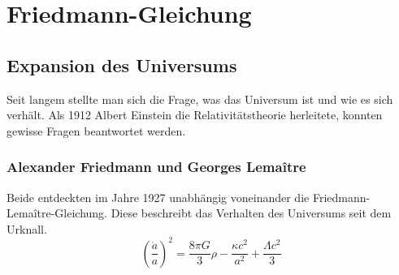 \chapter{Friedmann-Gleichung\label{chapter:thema}}
\begin{refsection}
\printbibliography[heading=subbibliography]
\section{Expansion des Universums}
Seit langem stellte man sich die Frage, was das Universum ist und wie es sich verhält. Als 1912 Albert Einstein die Relativitätstheorie herleitete, konnten gewisse Fragen beantwortet werden.
\subsection{Alexander Friedmann und Georges Lema\^{i}tre}
Beide entdeckten im Jahre 1927 unabhängig voneinander die Friedmann-Lema\^{i}tre-Gleichung. Diese beschreibt das Verhalten des Universums seit dem Urknall. 
\begin{equation}
\left(\frac{\dot{a}}{a}\right) ^2 = \frac{8 \pi G}{3} \rho - \frac{\kappa c^2}{a^2} + \frac{\Lambda c^2}{3}
\end{equation}

\end{refsection}
